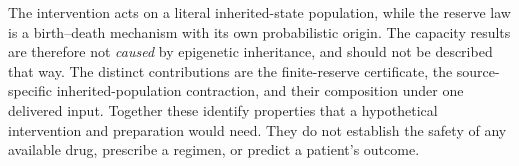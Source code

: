 The intervention acts on a literal inherited-state population, while the reserve law is a birth--death mechanism with its own probabilistic origin. The capacity results are therefore not \emph{caused} by epigenetic inheritance, and should not be described that way. The distinct contributions are the finite-reserve certificate, the source-specific inherited-population contraction, and their composition under one delivered input. Together these identify properties that a hypothetical intervention and preparation would need. They do not establish the safety of any available drug, prescribe a regimen, or predict a patient's outcome.
